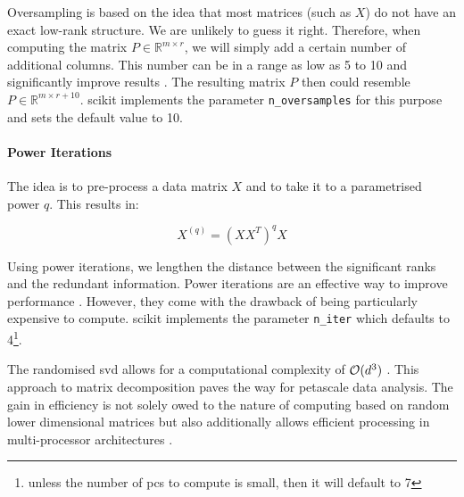 Oversampling is based on the idea that most matrices (such as $X$) do not have an exact low-rank structure.
We are unlikely to guess it right.
Therefore, when computing the matrix $P \in \mathbb{R}^{m \times r}$, we will simply add a certain number of additional columns.
This number can be in a range as low as 5 to 10 and significantly improve results \cite{martinsson2016randomized}.
The resulting matrix $P$ then could resemble $P \in \mathbb{R}^{m \times r+10}$.
\gls{scikit} implements the parameter \texttt{n\_oversamples} for this purpose and sets the default value to 10.



\paragraph{Power Iterations}

The idea is to pre-process a data matrix $X$ and to take it to a parametrised power $q$.
This results in:

\vspace{-4mm}
\begin{equation}
	\label{formula:powerIterations}
	X^{(q)} = (XX^T)^q X
\end{equation}

Using power iterations, we lengthen the distance between the significant ranks and the redundant information.
Power iterations are an effective way to improve performance \cite{halko2011finding}.
However, they come with the drawback of being particularly expensive to compute.
\gls{scikit} implements the parameter \texttt{n\_iter} which defaults to 4\footnote{%
unless the number of \glspl{pc} to compute is small, then it will default to 7%
}.
\bigskip
\bigskip


The randomised \gls{svd} allows for a computational complexity of $\mathcal{O}(d^3)$ \cite{HandsOnMLCh8}.
This approach to matrix decomposition paves the way for petascale data analysis.
The gain in efficiency is not solely owed to the nature of computing based on random lower dimensional matrices but also additionally allows efficient processing in multi-processor architectures \cite{halko2011finding}.



\clearpage
